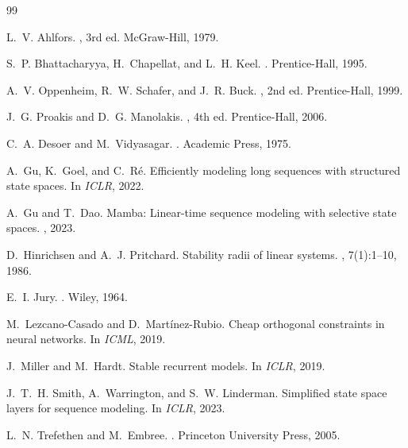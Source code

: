 \documentclass{article}
\theoremstyle{definition}
\begin{document}



\begin{thebibliography}{99}

L.~V. Ahlfors.
, 3rd ed.
\newblock McGraw-Hill, 1979.

S.~P. Bhattacharyya, H.~Chapellat, and L.~H. Keel.
.
\newblock Prentice-Hall, 1995.

A.~V. Oppenheim, R.~W. Schafer, and J.~R. Buck.
, 2nd ed.
\newblock Prentice-Hall, 1999.

J.~G. Proakis and D.~G. Manolakis.
, 4th ed.
\newblock Prentice-Hall, 2006.

C.~A. Desoer and M.~Vidyasagar.
.
\newblock Academic Press, 1975.

A.~Gu, K.~Goel, and C.~R\'e.
\newblock Efficiently modeling long sequences with structured state spaces.
\newblock In {\em ICLR}, 2022.

A.~Gu and T.~Dao.
\newblock Mamba: Linear-time sequence modeling with selective state spaces.
, 2023.

D.~Hinrichsen and A.~J. Pritchard.
\newblock Stability radii of linear systems.
, 7(1):1--10, 1986.

E.~I. Jury.
.
\newblock Wiley, 1964.

M.~Lezcano-Casado and D.~Mart\'inez-Rubio.
\newblock Cheap orthogonal constraints in neural networks.
\newblock In {\em ICML}, 2019.

J.~Miller and M.~Hardt.
\newblock Stable recurrent models.
\newblock In {\em ICLR}, 2019.

J.~T.~H. Smith, A.~Warrington, and S.~W. Linderman.
\newblock Simplified state space layers for sequence modeling.
\newblock In {\em ICLR}, 2023.

L.~N. Trefethen and M.~Embree.
.
\newblock Princeton University Press, 2005.

\end{thebibliography}
\end{document}
